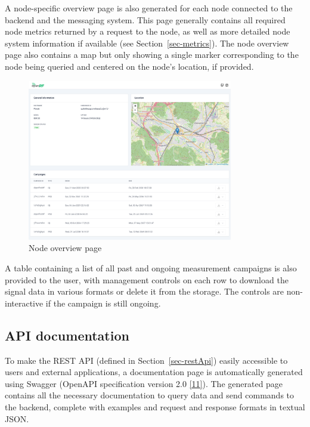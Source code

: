 \documentclass[
  letterpaper,
  a4paper,
  12pt,
  titlepage,
  oneside,
  openany]{book}
\begin{document}
A node-specific overview page is also generated for each node connected
to the backend and the messaging system. This page generally contains
all required node metrics returned by a request to the node, as well as
more detailed node system information if available (see
Section~\ref{sec-metrics}). The node overview page also contains a map
but only showing a single marker corresponding to the node being queried
and centered on the node's location, if provided.

\begin{figure}[h!]

{\centering \includegraphics[width=0.8\textwidth,height=\textheight]{assets/screenshots/node.pdf}

}

\caption{Node overview page}

\end{figure}

A table containing a list of all past and ongoing measurement campaigns
is also provided to the user, with management controls on each row to
download the signal data in various formats or delete it from the
storage. The controls are non-interactive if the campaign is still
ongoing.

\newpage{}

\hypertarget{api-documentation}{%
\subsection{API documentation}\label{api-documentation}}

To make the REST API (defined in Section~\ref{sec-restApi}) easily
accessible to users and external applications, a documentation page is
automatically generated using Swagger (OpenAPI specification version 2.0
\protect\hyperlink{ref-OpenAPISpecification2}{{[}11{]}}). The generated
page contains all the necessary documentation to query data and send
commands to the backend, complete with examples and request and response
formats in textual JSON.
\end{document}
